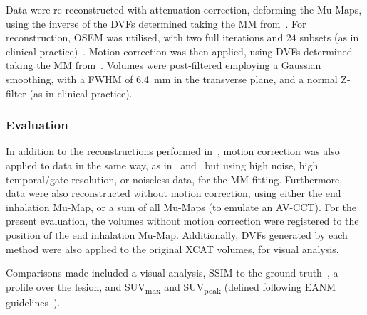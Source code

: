                 Data were re-reconstructed with attenuation correction, deforming the \glspl{Mu-Map}, using the inverse of the \glspl{DVF} determined taking the \gls{MM} from~. For reconstruction, \gls{OSEM} was utilised, with two full iterations and $24$ subsets (as in clinical practice)~\parencite{Hudson1994}. Motion correction was then applied, using \glspl{DVF} determined taking the \gls{MM} from~. Volumes were post-filtered employing a Gaussian smoothing, with a \gls{FWHM} of \SI{6.4}{\milli\metre} in the transverse plane, and a normal Z-filter (as in clinical practice).
            
            \subsubsection{Evaluation} \label{sec:pet_ct_motion_correction_exploiting_motion_models_fit_on_coarsely_gated_data_applied_to_finely_gated_data_methods_evaluation}
                In addition to the reconstructions performed in~, motion correction was also applied to data in the same way, as in~ and~ but using high noise, high temporal/gate resolution, or noiseless data, for the \gls{MM} fitting. Furthermore, data were also reconstructed without motion correction, using either the end inhalation \gls{Mu-Map}, or a sum of all \glspl{Mu-Map} (to emulate an \gls{AV-CCT}). For the present evaluation, the volumes without motion correction were registered to the position of the end inhalation \gls{Mu-Map}. Additionally, \glspl{DVF} generated by each method were also applied to the original \gls{XCAT} volumes, for visual analysis.
                
                Comparisons made included a visual analysis, \gls{SSIM} to the ground truth~\parencite{Wang2009MeanMeasures}, a profile over the lesion, and \gls{SUV}\textsubscript{max} and \gls{SUV}\textsubscript{peak} (defined following \gls{EANM} guidelines~\parencite{Boellaard2015FDG2.0}).
        
